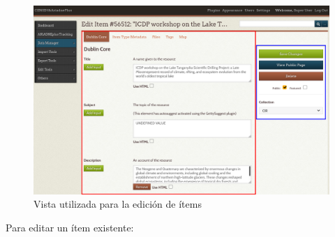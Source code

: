 \documentclass[
]{article}
\begin{document}
\begin{figure}
\hypertarget{edit-items-view}{%
\centering
\includegraphics{../_static/images/edit-items-view.png}
\caption{Vista utilizada para la edición de
ítems}\label{edit-items-view}
}
\end{figure}

Para editar un ítem existente:
\end{document}
